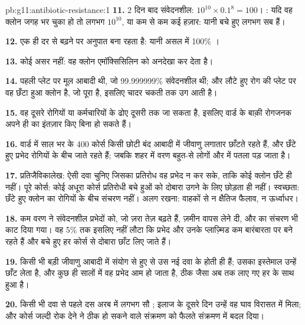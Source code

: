 \begin{solution}{pb:g11:antibiotic-resistance:1}
\textbf{11.} 2 दिन बाद संवेदनशील: $10^{10} \times 0.1^8 = 100$।
: यदि वह क्लोन जगह भर चुका हो तो लगभग $10^{10}$, या कम से कम कई
हज़ार: यानी बचे हुए लगभग सब  हैं।

\textbf{12.} एक ही दर से बढ़ने पर अनुपात बना रहता है: यानी असल में 100\%
।

\textbf{13.} कोई असर नहीं: वह  क्लोन एमॉक्सिसिलिन को अनदेखा कर
देता है।

\textbf{14.} पहली प्लेट पर मूल आबादी थी, जो 99.999999\% संवेदनशील थी; और
लौटे हुए रोग की प्लेट पर वह छँटा हुआ क्लोन है, जो पूरा  है,
इसलिए चादर चकती तक उग आती है।

\textbf{15.} वह  दूसरे रोगियों या कर्मचारियों के ढोए दूसरी  तक
जा सकता है, इसलिए वार्ड के बाक़ी रोगजनक अपने ही  का इंतज़ार किए
बिना  हो सकते हैं।

\textbf{16.} वार्ड में साल भर के 400 कोर्स किसी छोटी बंद आबादी में जीवाणु
लगातार छाँटते रहते हैं, और छँटे हुए प्रभेद रोगियों के बीच जाते रहते हैं;
जबकि शहर में वरण बहुत-से लोगों और  में पतला पड़ जाता है।

\textbf{17.} प्रतिजैविकालेख: ऐसी दवा चुनिए जिसका प्रतिरोध वह प्रभेद न कर
सके, ताकि कोई क्लोन छँटे ही नहीं। पूरे कोर्स: कोई अधूरा कोर्स प्रतिरोधी
बचे हुओं को दोबारा उगने के लिए छोड़ता ही नहीं। स्वच्छता: छँटे हुए क्लोन का
रोगियों के बीच संचरण नहीं। अलग रखना: वाहकों से न क्षैतिज फैलाव, न
ऊर्ध्वाधर।

\textbf{18.} कम वरण ने संवेदनशील प्रभेदों को, जो ज़रा तेज़ बढ़ते हैं,
ज़मीन वापस लेने दी, और  का संचरण भी काट दिया गया। वह 5\% तक
इसलिए नहीं लौटा कि  प्रभेद और उनके प्लाज़्मिड कम बारंबारता पर बने
रहते हैं और बचे हुए हर कोर्स से दोबारा छाँट लिए जाते हैं।

\textbf{19.} किसी भी बड़ी जीवाणु आबादी में संयोग से हुए  से उस
नई दवा के   होती ही हैं; उसका इस्तेमाल उन्हें छाँट लेता
है, और कुछ ही सालों में वह  प्रभेद आम हो जाता है, ठीक जैसा अब तक
लाए गए हर  के साथ हुआ है।

\textbf{20.} किसी भी दवा से पहले दस अरब में लगभग सौ  ;
इलाज के दूसरे दिन उन्हें वह घाव विरासत में मिला; और कोर्स जल्दी रोक देने
ने ठीक हो सकने वाले संक्रमण को फैलते  संक्रमण में बदल दिया।
\end{solution}
